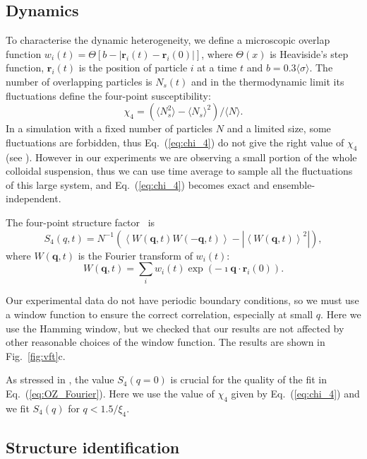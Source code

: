 \subsection*{Dynamics}

To characterise the dynamic heterogeneity, we define a microscopic overlap function $w_i(t) = \Theta [b - |\mathbf{r}_i(t) - \mathbf{r}_i(0)|]$, where $\Theta(x)$ is Heaviside’s step function, $\mathbf{r}_i(t)$ is the position
of particle $i$ at a time $t$ and $b=0.3\langle\sigma\rangle$.
The number of overlapping particles is $N_s(t)$ and in the thermodynamic limit its fluctuations define the four-point susceptibility:
\begin{equation}
\chi_4 = (\langle N_s^2\rangle - \langle N_s\rangle^2) /  \langle N\rangle. 
\label{eq:chi_4}
\end{equation}
In a simulation with a fixed number of particles $N$ and a limited size, some fluctuations are forbidden, thus Eq.~(\ref{eq:chi_4}) do not give the right value of $\chi_4$ (see \citep{Flenner2011}). However in our experiments we are observing a small portion of the whole colloidal suspension, thus we can use time average to sample all the fluctuations of this large system, and Eq.~(\ref{eq:chi_4}) becomes exact and ensemble-independent.

The four-point structure factor~\cite{Flenner2011} is
\begin{equation}
	S_4(q,t) = N^{-1}(\left\langle W(\mathbf{q},t) W(-\mathbf{q},t) \right\rangle - | \left\langle W(\mathbf{q},t) \right\rangle^2 |),   
	\label{eq:S4}
\end{equation}
where $W(\mathbf{q},t)$ is the Fourier transform of $w_i(t)$: 
\begin{equation}
	W(\mathbf{q},t) = \sum_i w_i(t)\exp(-\imath \mathbf{q}\cdot\mathbf{r}_i(0)).  
\end{equation}


Our experimental data do not have periodic boundary conditions, so we must use a window function to ensure the correct correlation, especially at small $q$. Here we use the Hamming window, but we checked that our results are not affected by other reasonable choices of the window function. The results are shown in Fig.~\ref{fig:vft}c.

As stressed in \citep{Flenner2011}, the value $S_4(q=0)$ is crucial for the quality of the fit in Eq.~(\ref{eq:OZ_Fourier}). Here we use the value of $\chi_4$ given by Eq.~(\ref{eq:chi_4}) and we fit $S_4(q)$ for $q<1.5/\xi_4$.

\subsection*{Structure identification}

